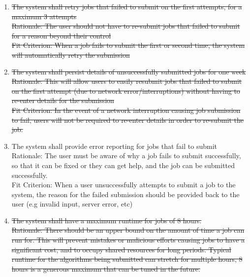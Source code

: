 \documentclass{article}
\begin{document}
\begin{enumerate}[label=\textbf{SR-\arabic*:}]{\leftmargin=1em \itemindent=0em}
    \item 
    \sout{
    The system shall retry jobs that failed to submit on the first attempts, for a maximum 3 attempts \\
    \newline Rationale: The user should not have to re-submit jobs that failed to submit for a reason beyond their control\\
    \newline Fit Criterion: When a job fails to submit the first or second time, the system will automatically retry the submission
    }
    \item \sout{The system shall persist details of unsuccessfully submitted jobs for one week\\
    \newline Rationale: This will allow users to easily resubmit jobs that failed to submit on the first attempt (due to network error/interruptions) without having to re-enter details for the submission \\
    \newline Fit Criterion: In the event of a network interruption causing job submission to fail, users will not be required to re-enter details in order to re-submit the job.}
    \item The system shall provide error reporting for jobs that fail to submit \\
    \newline Rationale: The user must be aware of why a job fails to submit successfully, so that it can be fixed or they can get help, and the job can be submitted successfully. \\
    \newline Fit Criterion:  When a user unsuccessfully attempts to submit a job to the system, the reason for the failed submission should be provided back to the user (e.g invalid input, server error, etc)
    \item \sout{The system shall have a maximum runtime for jobs of 8 hours. \\
    \newline Rationale: There should be an upper bound on the amount of time a job can run for. This will prevent mistakes or malicious efforts causing jobs to have a significant cost, and to occupy shared resources for long periods. Typical runtime for the algorithms being submitted can stretch for multiple hours, 8 hours is a generous maximum that can be tuned in the future. \\
}
\end{enumerate}
\end{document}
